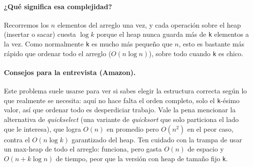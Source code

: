 


\paragraph{¿Qué significa esa complejidad?} Recorremos los $n$ elementos del
arreglo una vez, y cada operación sobre el heap (insertar o sacar) cuesta
$\log k$ porque el heap nunca guarda más de \texttt{k} elementos a la vez.
Como normalmente \texttt{k} es mucho más pequeño que $n$, esto es bastante
más rápido que ordenar todo el arreglo ($O(n \log n)$), sobre todo cuando
\texttt{k} es chico.

\paragraph{Consejos para la entrevista (Amazon).} Este problema suele usarse
para ver si sabes elegir la estructura correcta según lo que realmente se
necesita: aquí no hace falta el orden completo, solo el \texttt{k}-ésimo
valor, así que ordenar todo es desperdiciar trabajo. Vale la pena mencionar
la alternativa de \emph{quickselect} (una variante de \emph{quicksort} que
solo particiona el lado que le interesa), que logra $O(n)$ en promedio pero
$O(n^2)$ en el peor caso, contra el $O(n \log k)$ garantizado del heap. Ten
cuidado con la trampa de usar un max-heap de todo el arreglo: funciona, pero
gasta $O(n)$ de espacio y $O(n + k \log n)$ de tiempo, peor que la versión
con heap de tamaño fijo \texttt{k}.
